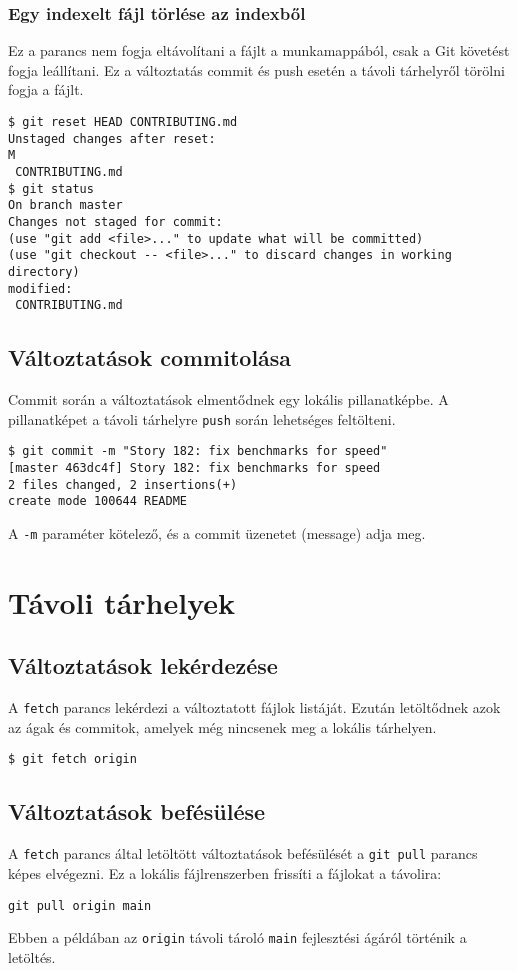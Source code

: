 \documentclass{article}
\begin{document}
\subsubsection*{Egy indexelt fájl törlése az indexből}
Ez a parancs nem fogja eltávolítani a fájlt a munkamappából, csak a Git követést fogja leállítani. Ez a változtatás commit és push esetén a távoli tárhelyről törölni fogja a fájlt.
\begin{lstlisting}
$ git reset HEAD CONTRIBUTING.md
Unstaged changes after reset:
M
 CONTRIBUTING.md
$ git status
On branch master
Changes not staged for commit:
(use "git add <file>..." to update what will be committed)
(use "git checkout -- <file>..." to discard changes in working directory)
modified:
 CONTRIBUTING.md
\end{lstlisting}

\subsection*{Változtatások commitolása}
Commit során a változtatások elmentődnek egy lokális pillanatképbe. A pillanatképet a távoli tárhelyre \texttt{push} során lehetséges feltölteni.
\begin{lstlisting}
$ git commit -m "Story 182: fix benchmarks for speed"
[master 463dc4f] Story 182: fix benchmarks for speed
2 files changed, 2 insertions(+)
create mode 100644 README
\end{lstlisting}
A \texttt{-m} paraméter kötelező, és a commit üzenetet (message) adja meg.

\newpage
\section{Távoli tárhelyek}
\subsection*{Változtatások lekérdezése}
A \texttt{fetch} parancs lekérdezi a változtatott fájlok listáját. Ezután letöltődnek azok az ágak és commitok, amelyek még nincsenek meg a lokális tárhelyen.
\begin{lstlisting}
$ git fetch origin
\end{lstlisting}

\subsection*{Változtatások befésülése}
A \texttt{fetch} parancs által letöltött változtatások befésülését a \texttt{git pull} parancs képes elvégezni. Ez a lokális fájlrenszerben frissíti a fájlokat a távolira:
\begin{lstlisting}
git pull origin main
\end{lstlisting}
Ebben a példában az \texttt{origin} távoli tároló \texttt{main} fejlesztési ágáról történik a letöltés.
\end{document}
